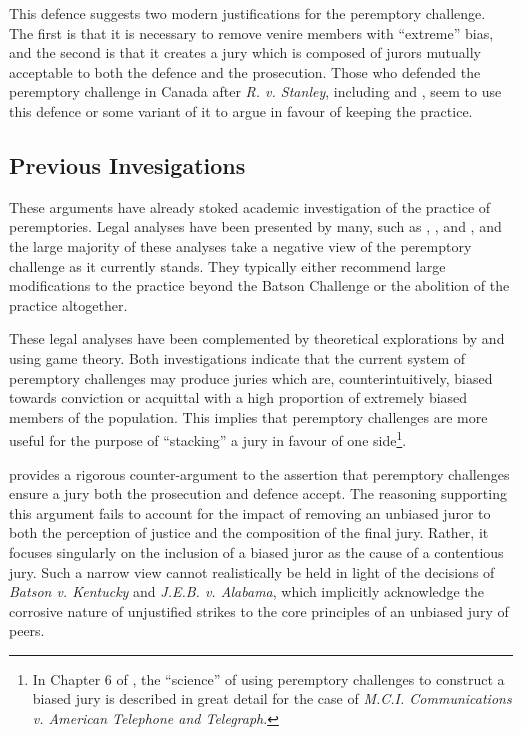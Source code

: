 This defence suggests two modern justifications for the peremptory challenge. The first is that it is necessary to remove venire members with
``extreme'' bias, and the second is that it creates a jury which is composed of jurors mutually acceptable to both the defence and
the prosecution. Those who defended the peremptory
challenge in Canada after \textit{R. v. Stanley}, including
\cite{peremparegood} and \cite{macnabproper}, seem to use this defence or some variant of it to argue in favour of keeping the
practice.

\subsection{Previous Invesigations} \label{sec:prevwork}

These arguments have already stoked academic investigation of the practice of peremptories. Legal analyses have been
presented by many, such as \cite{hoffman1997}, \cite{broderick1992}, and \cite{Nunn1993}, and the large majority of these
analyses take a negative view of the peremptory challenge as it currently stands. They typically either recommend large
modifications to the practice beyond the Batson Challenge or the abolition of the practice altogether.

These legal analyses have been complemented by theoretical explorations by \cite{ford2010} and \cite{flanagan2015} using game
theory. Both investigations indicate that the current system of peremptory challenges may produce juries which are, counterintuitively, biased
towards conviction or acquittal with a high proportion of extremely biased members of the population. This implies that peremptory challenges are more useful for the purpose of ``stacking'' a jury in favour of one side\footnote{In Chapter 6 of \cite{hansvidjudging}, the ``science'' of using peremptory challenges to construct a biased jury is described in great detail for the case of \textit{M.C.I. Communications v. American Telephone and Telegraph}.}.

\cite{hoffman1997} provides a rigorous counter-argument to the assertion that peremptory challenges ensure a jury both the prosecution and defence accept. The reasoning supporting this argument fails to account for the
impact of removing an unbiased juror to both the perception of justice and the composition of the final jury. Rather, it focuses
singularly on the inclusion of a biased juror as the cause of a contentious jury. Such a narrow view cannot
realistically be held in light of the decisions of \textit{Batson v. Kentucky} and \textit{J.E.B. v. Alabama}, which implicitly
acknowledge the corrosive nature of unjustified strikes to the core principles of an unbiased jury of peers.

